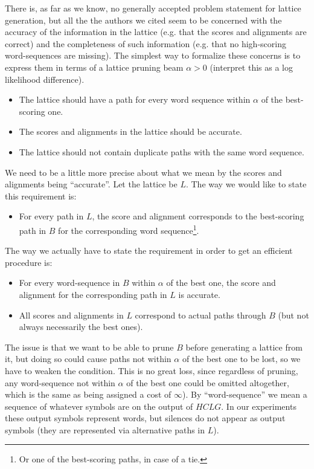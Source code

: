 \documentclass{article}
\def\HCLG{{\mathit{HCLG}}}
\begin{document}
There is, as far as we know, no generally accepted problem statement
for lattice generation, but all the the authors we cited seem to
be concerned with the accuracy of the information in the lattice (e.g. that the
scores and alignments are correct) and the completeness of such information (e.g.
that no high-scoring word-sequences are missing).  The simplest
way to formalize these concerns is to express them in terms of a lattice 
pruning beam $\alpha > 0$ (interpret this as a log likelihood difference).
\begin{itemize}
  \item The lattice should have a path for every word sequence within $\alpha$ of the best-scoring one.
  \item The scores and alignments in the lattice should be accurate.
  \item The lattice should not contain duplicate paths with the same word sequence.
\end{itemize}
We need to be a little more precise about what we mean by the scores
and alignments being ``accurate''.  Let the lattice be $L$.  The 
way we would like to state this requirement is:
\begin{itemize}
  \item For every path in $L$, the score and alignment corresponds to 
   the best-scoring path in $B$ for the corresponding word
   sequence\footnote{Or one of the best-scoring paths, in case of a tie.}.
\end{itemize}
The way we actually have to state the requirement in order to get an efficient procedure is:
\begin{itemize}
  \item For every word-sequence in $B$ within $\alpha$ of the best one, the score and alignment
    for the corresponding path in $L$ is accurate.
  \item All scores and alignments in $L$ correspond to actual paths through $B$ (but not always
   necessarily the best ones).
\end{itemize}
The issue is that we want to be able to prune $B$ before generating a lattice from it,
but doing so could cause paths not within $\alpha$ of the best one to be lost, so we have
to weaken the condition.  This is no great loss, since regardless
of pruning, any word-sequence not within $\alpha$ of the best one could be omitted altogether, 
which is the same as being assigned a cost of $\infty$).
By ``word-sequence'' we mean a sequence of whatever symbols are on the
output of $\HCLG$.  In our experiments these output symbols represent words, but
silences do not appear as output symbols (they are
represented via alternative paths in $L$).
\end{document}
